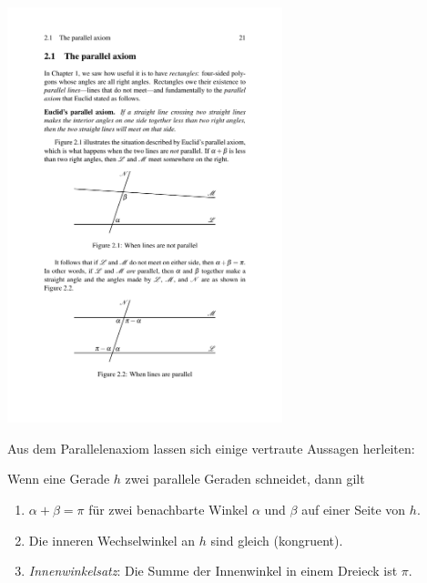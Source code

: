 \centerline{\includegraphics[width=8cm]{BILDER/BildParallelenaxiom.pdf}}



Aus dem Parallelenaxiom lassen sich einige vertraute Aussagen herleiten:


\begin{thm}
Wenn eine Gerade $h$ zwei parallele Geraden %
schneidet, dann gilt 
\begin{enumerate}
\item
$\alpha + \beta = \pi$
für zwei benachbarte Winkel $\alpha$ und $\beta$  auf einer
Seite von $h$. %

\item
Die inneren Wechselwinkel an $h$ sind gleich (kongruent).

\item
{\em Innenwinkelsatz}: Die Summe der Innenwinkel in einem Dreieck ist $\pi$. %

\end{enumerate}
\end{thm}



